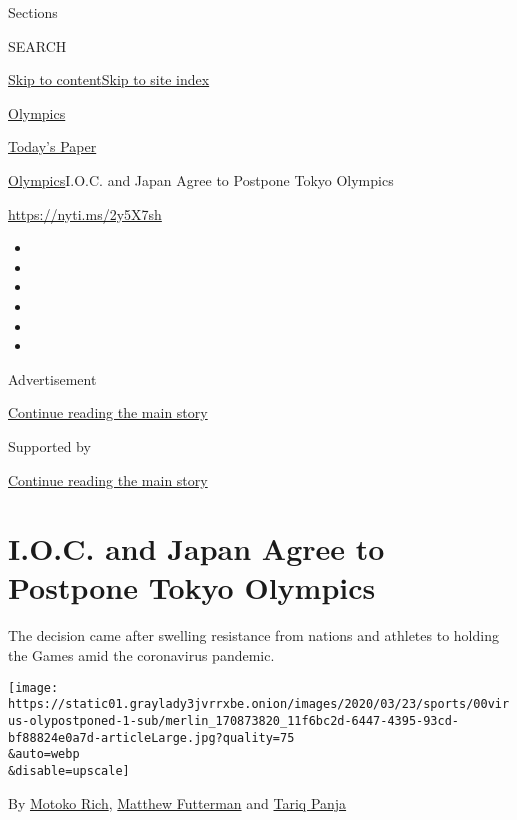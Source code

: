 Sections

SEARCH

\protect\hyperlink{site-content}{Skip to
content}\protect\hyperlink{site-index}{Skip to site index}

\href{https://www.nytimes3xbfgragh.onion/section/sports/olympics}{Olympics}

\href{https://myaccount.nytimes3xbfgragh.onion/auth/login?response_type=cookie\&client_id=vi}{}

\href{https://www.nytimes3xbfgragh.onion/section/todayspaper}{Today's
Paper}

\href{/section/sports/olympics}{Olympics}\textbar{}I.O.C. and Japan
Agree to Postpone Tokyo Olympics

\url{https://nyti.ms/2y5X7sh}

\begin{itemize}
\item
\item
\item
\item
\item
\item
\end{itemize}

Advertisement

\protect\hyperlink{after-top}{Continue reading the main story}

Supported by

\protect\hyperlink{after-sponsor}{Continue reading the main story}

\hypertarget{ioc-and-japan-agree-to-postpone-tokyo-olympics}{%
\section{I.O.C. and Japan Agree to Postpone Tokyo
Olympics}\label{ioc-and-japan-agree-to-postpone-tokyo-olympics}}

The decision came after swelling resistance from nations and athletes to
holding the Games amid the coronavirus pandemic.

\texttt{[image: https://static01.graylady3jvrrxbe.onion/images/2020/03/23/sports/00virus-olypostponed-1-sub/merlin\_170873820\_11f6bc2d-6447-4395-93cd-bf88824e0a7d-articleLarge.jpg?quality=75\\\&auto=webp\\\&disable=upscale]}

By \href{https://www.nytimes3xbfgragh.onion/by/motoko-rich}{Motoko
Rich},
\href{https://www.nytimes3xbfgragh.onion/by/matthew-futterman}{Matthew
Futterman} and
\href{https://www.nytimes3xbfgragh.onion/by/tariq-panja}{Tariq Panja}

